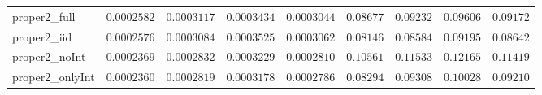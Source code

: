 \begin{table}
\begin{tabular}{lcccccccc}
proper2_full  & $0.0002582$ & $0.0003117$ & $0.0003434$ & $0.0003044$ & $0.08677$ & $0.09232$ & $0.09606$ & $0.09172$ \\
proper2_iid  & $0.0002576$ & $0.0003084$ & $0.0003525$ & $0.0003062$ & $0.08146$ & $0.08584$ & $0.09195$ & $0.08642$ \\
proper2_noInt  & $0.0002369$ & $0.0002832$ & $0.0003229$ & $0.0002810$ & $0.10561$ & $0.11533$ & $0.12165$ & $0.11419$ \\
proper2_onlyInt  & $0.0002360$ & $0.0002819$ & $0.0003178$ & $0.0002786$ & $0.08294$ & $0.09308$ & $0.10028$ & $0.09210$ \\
\hline 
\end{tabular}


\end{table}
